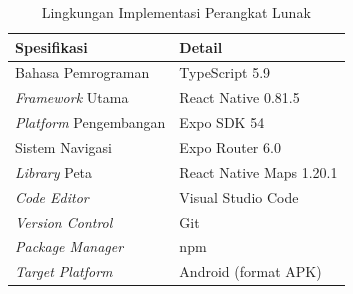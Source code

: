 \begin{table}[H]
\centering
\caption{Lingkungan Implementasi Perangkat Lunak}
\label{tab:sw}
\begin{tabular}{|p{5cm}|p{8cm}|}
\hline
\textbf{Spesifikasi} & \textbf{Detail} \\ \hline
Bahasa Pemrograman       & TypeScript 5.9 \\ \hline
\textit{Framework} Utama & React Native 0.81.5 \\ \hline
\textit{Platform} Pengembangan & Expo SDK 54 \\ \hline
Sistem Navigasi          & Expo Router 6.0 \\ \hline
\textit{Library} Peta    & React Native Maps 1.20.1 \\ \hline
\textit{Code Editor}     & Visual Studio Code \\ \hline
\textit{Version Control} & Git \\ \hline
\textit{Package Manager} & npm \\ \hline
\textit{Target Platform} & Android (format APK) \\ \hline
\end{tabular}
\end{table}